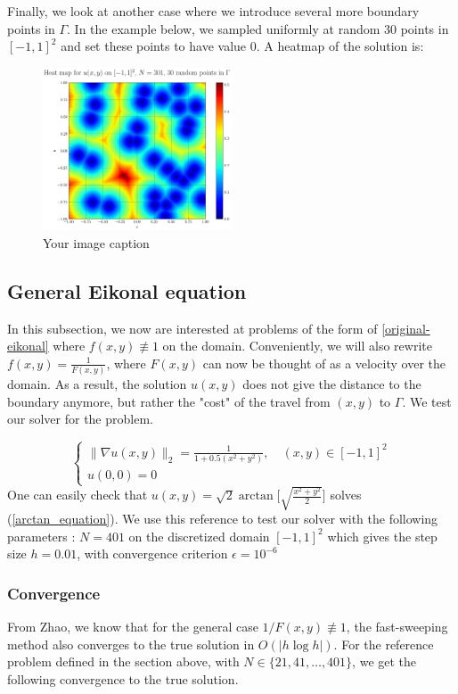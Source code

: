 \documentclass[11pt]{article}
\theoremstyle{definition}
\theoremstyle{remark}
\begin{document}
\vspace{5pt}
\noindent Finally, we look at another case where we introduce several more boundary points in $\Gamma$. In the example below, we sampled uniformly at random 30 points in $[-1,1]^2$ and set these points to have value 0. A heatmap of the solution is:

\begin{figure}[h!]
  \centering
  \includegraphics[width=0.5\textwidth]{plots/heatmap_random30.png}
  \caption{Your image caption}
  \label{fig:heatmap30random}
\end{figure}
\newpage
\subsection{General Eikonal equation}
In this subsection, we now are interested at problems of the form of \ref{original-eikonal} where $f(x,y)\not\equiv 1$ on the domain. Conveniently, we will also rewrite $f(x,y)=\frac{1}{F(x,y)}$, where $F(x,y)$ can now be thought of as a velocity over the domain. As a result, the solution $u(x,y)$ does not give the distance to the boundary anymore, but rather the "cost" of the travel from $(x,y)$ to $\Gamma$.
We test our solver for the problem.

\begin{equation}
\label{arctan_equation}
    \begin{cases}
        \|\nabla u(x,y)\|_2=\frac{1}{1+0.5(x^2+y^2)} , \quad(x,y) \in [-1,1]^2 \\
        u(0,0)= 0
    \end{cases}
\end{equation}
One can easily check that $u(x,y)=\sqrt{2}\arctan\Big[\sqrt{\frac{x^2+y^2}{2}}\Big]$ solves (\ref{arctan_equation}). We use this reference to test our solver with the following parameters : $N=401$ on the discretized domain $[-1,1]^2$ which gives the step size $h=0.01$, with convergence criterion $\epsilon=10^{-6}$
\subsubsection{Convergence}
From Zhao, we know that for the general case $1/F(x,y)\not\equiv1$, the fast-sweeping method also converges to the true solution in $O(|h\log h|)$. For the reference problem defined in the section above, with $N\in\{21,41,\dots,401\}$, we get the following convergence to the true solution.
\end{document}
